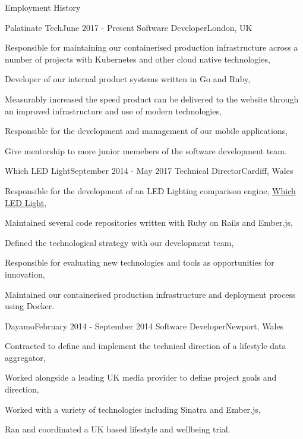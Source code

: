 \documentclass{resume}
\begin{document}
\begin{rSection}{Employment History}
  \begin{rSubsection}{Palatinate Tech}{June 2017 - Present}
    {Software Developer}{London, UK}
  \item Responsible for maintaining our containerised production infrastructure
    across a number of projects with Kubernetes and other cloud native
    technologies,
  \item Developer of our internal product systems written in Go and Ruby,
  \item Measurably increased the speed product can be delivered to the website
    through an improved infrastructure and use of modern technologies,
  \item Responsible for the development and management of our mobile
    applications,
  \item Give mentorship to more junior memebers of the software development
    team.
  \end{rSubsection}

  \begin{rSubsection}{Which LED Light}{September 2014 - May 2017}
    {Technical Director}{Cardiff, Wales}
  \item Responsible for the development of an LED Lighting comparison engine,
    \href{https://www.whichledlight.com}{Which LED Light},
  \item Maintained several code repositories written with Ruby on Rails and
    Ember.js,
  \item Defined the technological strategy with our development team,
  \item Responsible for evaluating new technologies and tools as opportunities
    for innovation,
  \item Maintained our containerised production infrastructure and deployment
    process using Docker.
  \end{rSubsection}

  \begin{rSubsection}{Dayamo}{February 2014 - September 2014}
    {Software Developer}{Newport, Wales}
  \item Contracted to define and implement the technical direction of a
    lifestyle data aggregator,
  \item Worked alongside a leading UK media provider to define project goals
    and direction,
  \item Worked with a variety of technologies including Sinatra and Ember.js,
  \item Ran and coordinated a UK based lifestyle and wellbeing trial.
  \end{rSubsection}


\end{rSection}
\end{document}
